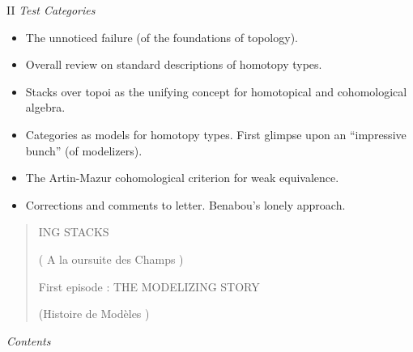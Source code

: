 \documentclass[11pt,a4paper]{article}
\begin{document}
II \emph{Test Categories}
\begin{itemize}
  \item[14.] The unnoticed failure (of the foundations of topology).
  \item[15.] Overall review on standard descriptions of homotopy types.
  \item[16.] Stacks over topoi as the unifying concept for homotopical and cohomological algebra.
  \item[16'.] Categories as models for homotopy types. First glimpse upon an ``impressive bunch'' (of modelizers).
  \item[17.] The Artin-Mazur cohomological criterion for weak equivalence.
  \item[18.] Corrections and comments to letter. Benabou's lonely approach.
\end{itemize}

\begin{quote}
ING STACKS

( A la oursuite des Champs )

First episode : THE MODELIZING STORY

(Histoire de Modèles )
\end{quote}

\emph{Contents}
\end{document}
